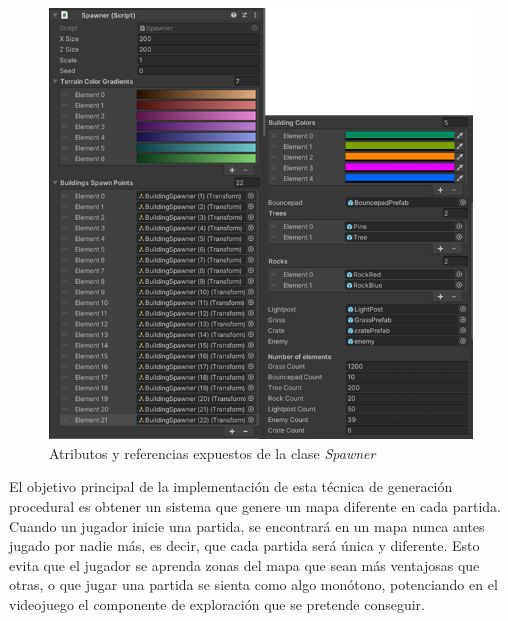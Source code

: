 \begin{enumerate}
    \begin{figure}[h]
	\centering
	\includegraphics[scale=0.5]{img/SpawnerAttributes.png}
	\caption{Atributos y referencias expuestos de la clase \textit{Spawner}}
	\label{fig:AtributosGenerador}
    \end{figure}
\end{enumerate}

El objetivo principal de la implementación de esta técnica de generación procedural es obtener un sistema que genere un mapa diferente en cada partida. Cuando un jugador inicie una partida, se encontrará en un mapa nunca antes jugado por nadie más, es decir, que cada partida será única y diferente. Esto evita que el jugador se aprenda zonas del mapa que sean más ventajosas que otras, o que jugar una partida se sienta como algo monótono, potenciando en el videojuego el componente de exploración que se pretende conseguir.

